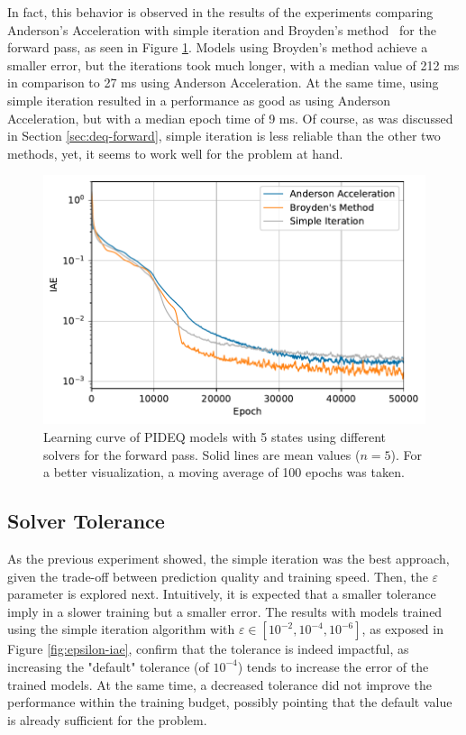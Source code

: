 In fact, this behavior is observed in the results of the experiments comparing Anderson's Acceleration with simple iteration and Broyden's method~\cite{broyden_class_1965} for the forward pass, as seen in Figure \ref{fig:solver-iae}.
Models using Broyden's method achieve a smaller error, but the iterations took much longer, with a median value of 212 ms in comparison to 27 ms using Anderson Acceleration.
At the same time, using simple iteration resulted in a performance as good as using Anderson Acceleration, but with a median epoch time of 9 ms.
Of course, as was discussed in Section \ref{sec:deq-forward}, simple iteration is less reliable than the other two methods, yet, it seems to work well for the problem at hand.

\begin{figure}[h]
    \centering
    \includegraphics{images/exp_5_iae.pdf}
    \caption[Learning curve of \gls{PIDEQ} models with 5 states using different solvers for the forward pass.]{Learning curve of \gls{PIDEQ} models with 5 states using different solvers for the forward pass. Solid lines are mean values ($n=5$). For a better visualization, a moving average of 100 epochs was taken.}
    \label{fig:solver-iae}
\end{figure}

\subsection{Solver Tolerance}

As the previous experiment showed, the simple iteration was the best approach, given the trade-off between prediction quality and training speed.
Then, the $\varepsilon$ parameter is explored next.
Intuitively, it is expected that a smaller tolerance imply in a slower training but a smaller error.
The results with models trained using the simple iteration algorithm with $\varepsilon \in \left[ 10^{-2}, 10^{-4},10^{-6} \right] $, as exposed in Figure \ref{fig:epsilon-iae}, confirm that the tolerance is indeed impactful, as increasing the "default" tolerance (of $10^{-4}$) tends to increase the error of the trained models.
At the same time, a decreased tolerance did not improve the performance within the training budget, possibly pointing that the default value is already sufficient for the problem.

